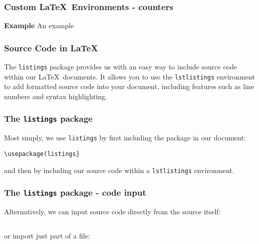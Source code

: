 \documentclass[mathserif]{beamer}
\begin{document}
\begin{frame}[fragile]
\frametitle{Custom \LaTeX\ Environments - counters}
\vfill
\begin{LTXexample}[style=latexsty]
\newenvironment{numberedexample}{\textbf{Example }\qquad}{}

\begin{numberedexample}
An example
\end{numberedexample}

\end{LTXexample}
\vfill
\end{frame}


\begin{frame}[fragile]
\frametitle{Source Code in \LaTeX}

\vfill
The \texttt{listings} package provides us with an easy way to include source code within our \LaTeX\ documents.
\vfill
It allows you to use the \texttt{lstlistings} environment to add formatted source code into your document, including features such as line numbers and syntax highlighting.
\vfill

\end{frame}


\begin{frame}[fragile]
\frametitle{The \texttt{listings} package}
\vfill
Most simply, we use \texttt{listings} by first including the package in our document:
\vfill
\begin{lstlisting}[style=latexsty]
\usepackage(listings}
\end{lstlisting}
\vfill
and then by including our source code within a \texttt{lstlistings} environment.

\vfill

\end{frame}


\begin{frame}[fragile]
\frametitle{The \texttt{listings} package - code input}
\vfill
Alternatively, we can input source code directly from the source itself:
\vfill
\begin{lstlisting}[style=latexsty]

\end{lstlisting}
\vfill
or import just part of a file:
\vfill
\begin{lstlisting}[style=latexsty]

\end{lstlisting}
\vfill
\end{frame}
\end{document}
